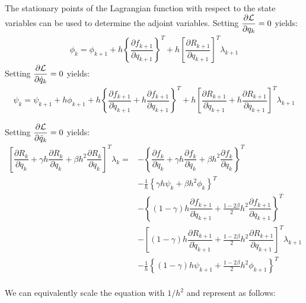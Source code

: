 \documentclass[10pt,letter]{book}
\newcommand{\pd}[2]{\dfrac{\partial #1}{\partial #2}}
\begin{document}
     The stationary points of the Lagrangian function with respect to the
     state variables can be used to determine the adjoint
     variables. Setting $\pd{\cal{L}}{{q}_k} = 0$ yields:
     \begin{equation}
       \begin{split}
         \phi_k = \phi_{k+1} +  h \left\{\pd{f_{k+1}}{{q}_{k+1}} \right\}^T + h \left[ \pd{R_{k+1}}{{q}_{k+1}} \right]^T \lambda_{k+1}  
       \end{split}
     \end{equation}
     Setting $\pd{\cal{L}}{\dot{q}_k} = 0$ yields:
     \begin{equation}
       \begin{split}
         \psi_k = \psi_{k+1} + h \phi_{k+1} + h \left\{  \pd{f_{k+1}}{\dot{q}_{k+1}} +  h \pd{f_{k+1}}{{q}_{k+1}} \right\}^T 
         + h \left[ \pd{R_{k+1}}{\dot{q}_{k+1}} +  h \pd{R_{k+1}}{{q}_{k+1}} \right]^T \lambda_{k+1}
       \end{split}
     \end{equation}

     Setting $\pd{\cal{L}}{\ddot{q}_k} = 0$ yields:
     \begin{equation}
       \begin{split}
         \left[ \pd{R_k}{\ddot{q}_k} + \gamma h \pd{R_k}{\dot{q}_k} + \beta h^2 \pd{R_k}{{q}_k} \right]^T \lambda_k = &- \left\{ \pd{f_k}{\ddot{q}_k} + \gamma h \pd{f_k}{\dot{q}_k} + \beta h^2 \pd{f_k}{{q}_k} \right\}^T \\
         & -  \frac{1}{h}\left\{  \gamma h  \psi_k + \beta h^2   \phi_k \right\}^T\\
         & -  \left\{ (1-\gamma) h \pd{f_{k+1}}{\dot{q}_{k+1}} + \frac{1-2\beta}{2} h^2 \pd{f_{k+1}}{{q}_{k+1}} \right\}^T \\
         & -  \left[ (1-\gamma) h \pd{R_{k+1}}{\dot{q}_{k+1}} + \frac{1-2\beta}{2} h^2 \pd{R_{k+1}}{{q}_{k+1}} \right]^T\lambda_{k+1} \\
         & -  \frac{1}{h} \left\{ (1-\gamma) h \psi_{k+1} + \frac{1-2\beta}{2} h^2 \phi_{k+1} \right\}^T\\
       \end{split}
     \end{equation}

     We can equivalently scale the equation with $1/h^2$ and represent as follows:
\end{document}
